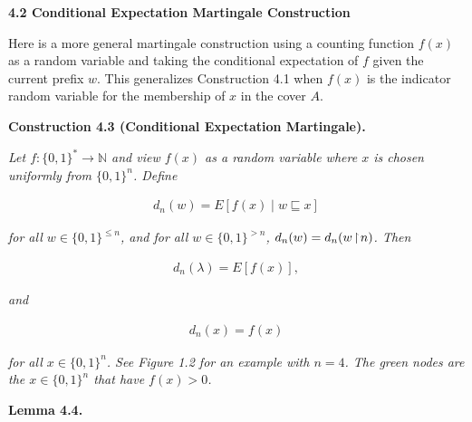 \documentclass[10pt,a4paper]{article}
\begin{document}
\par\medskip\noindent\textbf{
4.2 Conditional Expectation Martingale Construction}\par




Here is a more general martingale construction using a counting function $f(x)$ as a random variable and taking the conditional expectation of $f$ given the current prefix $w$. This generalizes Construction 4.1 when $f(x)$ is the indicator random variable for the membership of $x$ in the cover $A$.\par





\par\medskip\noindent\textbf{
\textbf{Construction 4.3}\textbf{ }(Conditional Expectation Martingale)\textbf{.}
}\par



\emph{Let $f:\{0,1\}^{*}\to\mathbb{N}$
and view $f(x)$ as a random variable where $x$ is chosen uniformly from $\{0,1\}^{n}$. Define}\par


\[\begin{gathered}
d_{n}(w)=E[f(x)\mid w\sqsubseteq x]
\end{gathered}\]


\emph{for all $w\in\{0,1\}^{\leq n}$, and for all $w\in\{0,1\}^{>n}$, $d_{n}(w)=d_{n}(w\negthinspace\upharpoonright\negthinspace n)$.
Then}\par


\[\begin{gathered}
d_{n}(\lambda)=E[f(x)],
\end{gathered}\]


\emph{and}\par


\[\begin{gathered}
d_{n}(x)=f(x)
\end{gathered}\]


\emph{for all $x\in\{0,1\}^{n}$.
See Figure 1.2 for an example with $n=4$. The green nodes are the $x\in\{0,1\}^{n}$ that have $f(x)>0$.}\par







\par\medskip\noindent\textbf{
\textbf{Lemma 4.4}\textbf{.}
}\par
\end{document}
